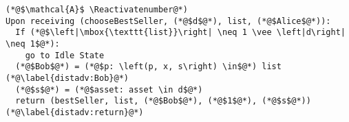 \Suppressnumber
\begin{lstlisting}[label=distadv, style=numbers]
(*@$\mathcal{A}$ \Reactivatenumber@*)
Upon receiving (chooseBestSeller, (*@$d$@*), list, (*@$Alice$@*)):
  If (*@$\left|\mbox{\texttt{list}}\right| \neq 1 \vee \left|d\right| \neq 1$@*):
    go to Idle State
  (*@$Bob$@*) = (*@$p: \left(p, x, s\right) \in$@*) list (*@\label{distadv:Bob}@*)
  (*@$s$@*) = (*@$asset: asset \in d$@*)
  return (bestSeller, list, (*@$Bob$@*), (*@$1$@*), (*@$s$@*)) (*@\label{distadv:return}@*)
\end{lstlisting}
